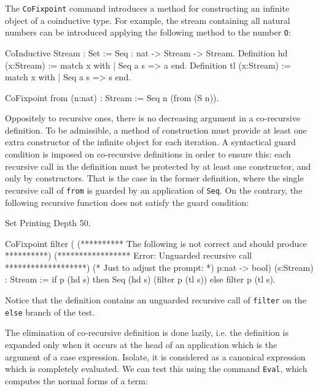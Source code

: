 The {\tt CoFixpoint} command introduces a method for constructing an
infinite object of a coinduc\-tive type. For example, the stream
containing all natural numbers can be introduced applying the
following method to the number \texttt{O}:

\begin{coq_example*}
CoInductive Stream : Set :=
    Seq : nat -> Stream -> Stream.
Definition hd (x:Stream) := match x with
                            | Seq a s => a
                            end.
Definition tl (x:Stream) := match x with
                            | Seq a s => s
                            end.
\end{coq_example*}
\begin{coq_example}
CoFixpoint from (n:nat) : Stream := Seq n (from (S n)).
\end{coq_example}

Oppositely to recursive ones, there is no decreasing argument in a
co-recursive definition. To be admissible, a method of construction
must provide at least one extra constructor of the infinite object for
each iteration. A syntactical guard condition is imposed on
co-recursive definitions in order to ensure this: each recursive call
in the definition must be protected by at least one constructor, and
only by constructors. That is the case in the former definition, where
the single recursive call of \texttt{from} is guarded by an
application of \texttt{Seq}. On the contrary, the following recursive
function does not satisfy the guard condition:

\begin{coq_eval}
Set Printing Depth 50.
\end{coq_eval}
\begin{coq_example*}
CoFixpoint filter
 (
  (********** The following is not correct and should produce **********)
  (***************** Error: Unguarded recursive call *******************)
  (* Just to adjust the prompt: *) p:nat -> bool) (s:Stream) :
 Stream :=
  if p (hd s) then Seq (hd s) (filter p (tl s)) else filter p (tl s).
\end{coq_example*}

\noindent Notice that the definition contains an unguarded recursive
call of \texttt{filter} on the \texttt{else} branch of the test.

The elimination of co-recursive definition is done lazily, i.e. the
definition is expanded only when it occurs at the head of an
application which is the argument of a case expression.  Isolate, it
is considered as a canonical expression which is completely
evaluated. We can test this using the command \texttt{Eval},
which computes the normal forms of a term:

